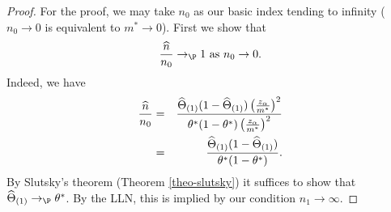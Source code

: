 \begin{proof}
For the proof, we may take $n_{0}$ as our basic index tending to infinity ($%
n_{0}\rightarrow 0$ is equivalent to $m^{\ast }\rightarrow 0$). First we
show that 
\begin{equation}
\frac{\widehat{n}}{n_{0}}\rightarrow _{\P }1\text{ as }n_{0}\rightarrow 0.
\label{firststep-n-0}
\end{equation}%
Indeed, we have 
\begin{eqnarray*}
\frac{\widehat{n}}{n_{0}} &=&\frac{\widehat{\Theta}_{(1)}(1-\widehat{\Theta}_{(1)})\left( \frac{%
z_{\alpha}}{m^{\ast }}\right) ^{2}}{\theta^*(1-\theta^*)\left( \frac{z_{\alpha}}{m^{\ast }}\right) ^{2}} \\
&=&\frac{\widehat{\Theta}_{(1)}(1-\widehat{\Theta}_{(1)})}{\theta^*(1-\theta^*)}.
\end{eqnarray*}%
By Slutsky's theorem (Theorem \ref{theo-slutsky}) it suffices to show that $%
\widehat{\Theta}_{(1)}\rightarrow _{\P }\theta^*$. By the LLN, this is implied by our
condition $n_{1}\rightarrow \infty $.


\end{proof}
